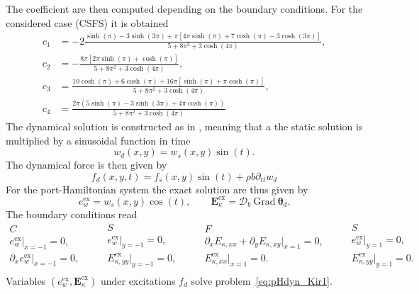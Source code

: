 The coefficient are then computed depending on the boundary conditions. For the considered case (CSFS) it is obtained
\begin{align*}
c_1 &= -2 \frac{\sinh(\pi) - 3 \sinh(3\pi) + \pi[4\pi\sinh(\pi)+7\cosh(\pi) - 3\cosh(3 \pi)]}{5 + 8\pi^2 + 3\cosh(4\pi)}, \\
c_2 &= - \frac{8\pi[2\pi\sinh(\pi) + \cosh(\pi)]}{5 + 8\pi^2 + 3\cosh(4\pi)}, \\
c_3 &= \frac{10\cosh(\pi) + 6\cosh(\pi) + 16\pi[\sinh(\pi) + \pi\cosh(\pi)]}{5 + 8 \pi^2 + 3\cosh(4\pi)}, \\
c_4 &= \frac{2\pi(5\sinh(\pi) - 3\sinh(3\pi) + 4\pi\cosh(\pi))}{5 + 8\pi^2 + 3\cosh(4\pi)}
\end{align*}
The dynamical solution is constructed as in , meaning that a the static solution is multiplied by a sinusoidal function in time
\begin{equation*}
w_d(x, y) = w_s(x, y) \sin(t).
\end{equation*}
The dynamical force is then given by
\begin{equation*}
f_d(x,y,t) = f_s(x,y)\sin(t) +  \rho b \partial_{tt} w_d
\end{equation*}
For the port-Hamiltonian system the exact solution  are thus given by
\begin{equation}
e_w^\text{ex} = w_s(x,y) \cos(t), \qquad \bm{E}_\kappa^\text{ex} =  \bm{\mathcal{D}}_b \ \mathrm{Grad} \ \bm{\theta}_d.
\end{equation}
The boundary conditions read
\begin{equation}
\begin{aligned}
C \\
e_w^\text{ex}\vert_{x=-1} = 0, \\
\partial_{x} e_w^\text{ex}\vert_{x=-1} = 0, \\
\end{aligned} \qquad
\begin{aligned}
S \\
e_w^\text{ex}\vert_{y=-1} = 0, \\
{E}_{\kappa, yy}^\text{ex}\vert_{y=-1} =  0, \\
\end{aligned} \qquad
\begin{aligned}
F \\
\partial_x {E}_{\kappa, xx} + \partial_y {E}_{\kappa, xy}\vert_{x=1} = 0, \\
{E}_{\kappa, xx}^\text{ex}\vert_{x=1} =  0. \\
\end{aligned} \qquad
\begin{aligned}
S \\
e_w^\text{ex}\vert_{y=1} = 0, \\
{E}_{\kappa, yy}^\text{ex}\vert_{y=1} =  0. \\
\end{aligned} 
\end{equation}
Variables $(e_w^\text{ex}, \bm{E}_\kappa^\text{ex})$ under excitations $f_d$ solve problem~\eqref{eq:pHdyn_Kir1}. 

